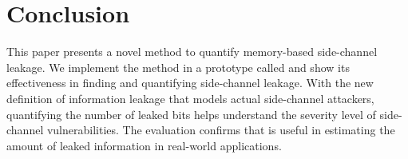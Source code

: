 \section{Conclusion}
This paper presents a novel  %
method to
quantify memory-based side-channel leakage. We implement the method in
a prototype called \tool{} and show its effectiveness in finding
and quantifying side-channel leakage. With the new definition of
information leakage that models actual side-channel attackers, quantifying the number of
leaked bits helps understand the severity level
of side-channel vulnerabilities. The evaluation confirms that \tool{} is useful in estimating the amount of leaked information in
real-world applications.
